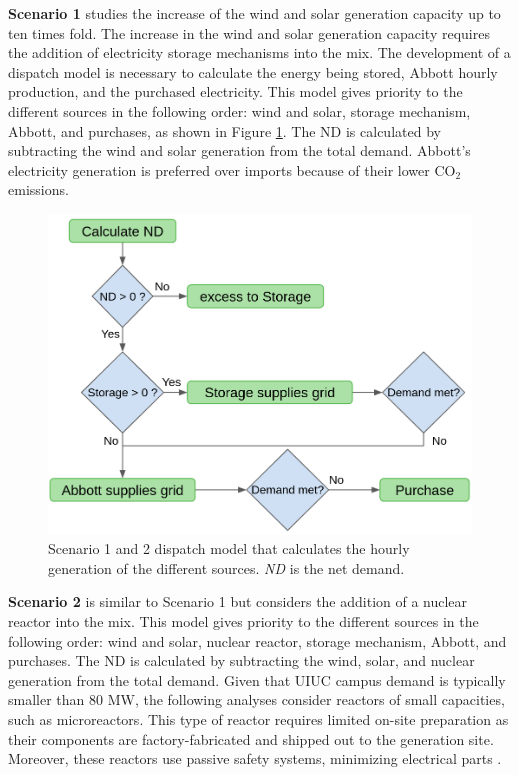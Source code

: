 \documentclass{anstrans}
\begin{document}
\textbf{Scenario 1} studies the increase of the wind and solar generation capacity up to ten times fold.
The increase in the wind and solar generation capacity requires the addition of electricity storage mechanisms into the mix.
The development of a dispatch model is necessary to calculate the energy being stored, Abbott hourly production, and the purchased electricity.
This model gives priority to the different sources in the following order: wind and solar, storage mechanism, Abbott, and purchases, as shown in Figure \ref{fig:dispatch-model}.
The \gls{ND} is calculated by subtracting the wind and solar generation from the total demand.
Abbott’s electricity generation is preferred over imports because of their lower CO$_2$ emissions.

\begin{figure}[htbp!] %
    \centering
    \includegraphics[width=0.90\linewidth]{figures/dispatch-model}
    \hfill
    \caption{Scenario 1 and 2 dispatch model that calculates the hourly generation of the different sources. \textit{ND} is the net demand.}
    \label{fig:dispatch-model}
\end{figure}

\textbf{Scenario 2} is similar to Scenario 1 but considers the addition of a nuclear reactor into the mix.
This model gives priority to the different sources in the following order: wind and solar, nuclear reactor, storage mechanism, Abbott, and purchases.
The \gls{ND} is calculated by subtracting the wind, solar, and nuclear generation from the total demand.
Given that UIUC campus demand is typically smaller than 80 MW, the following analyses consider reactors of small capacities, such as microreactors.
This type of reactor requires limited on-site preparation as their components are factory-fabricated and shipped out to the generation site.
Moreover, these reactors use passive safety systems, minimizing electrical parts \cite{us-doe_ultimate_2019}.
\end{document}
